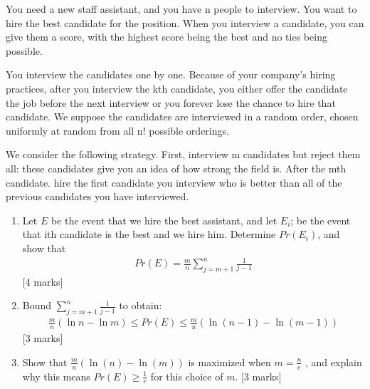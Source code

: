 \begin{que}
	You need a new staff assistant, and you have n people to interview. You
	want to hire the best candidate for the position. When you interview a
	candidate, you can give them a score, with the highest score being the
	best and no ties being possible.

	You interview the candidates one by one. Because of your company’s
	hiring practices, after you interview the kth candidate, you either
	offer the candidate the job before the next interview or you forever
	lose the chance to hire that candidate. We suppose the candidates are
	interviewed in a random order, chosen uniformly at random from all n!
	possible orderings.

	We consider the following strategy. First, interview m candidates but
	reject them all: these candidates give you an idea of how strong the
	field is. After the mth candidate. hire the first candidate you
	interview who is better than all of the previous candidates you have
	interviewed.

	\begin{enumerate}
		\item Let $E$ be the event that we hire the best assistant, and let $E_i$;
		      be the event that ith candidate is the best and we hire him.
		      Determine $Pr(E_i)$, and show that
		      \begin{align}
			      Pr(E) = \frac{m}{n}\sum_{j=m+1}^{n} \frac{1}{j-1}
		      \end{align}
		      \hspace*{\fill}[4 marks]
		\item Bound $\sum_{j=m+1}^n \frac{1}{j-1}$ to obtain:
		      \begin{align}
			      \frac{m}{n}(\ln{n} - \ln{m}) \leq Pr(E) \leq
			      \frac{m}{n}(\ln(n-1) - \ln(m-1))
		      \end{align}
		      \hspace*{\fill}[3 marks]
		\item Show that $\frac{m}{n}(\ln(n) - \ln(m))$ is maximized
		      when $m = \frac{n}{e}$ , and explain why this means $Pr(E)
			      \geq \frac{1}{e}$ for this choice of $m$.
		      \hspace*{\fill}[3 marks]
	\end{enumerate}
\end{que}

